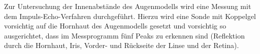 Zur Untersuchung der Innenabstände des Augenmodells wird eine Messung mit dem Impuls-Echo-Verfahren durchgeführt. Hierzu wird eine Sonde mit Koppelgel vorsichtig auf die Hornhaut des Augenmodells gesetzt und vorsichtig so ausgerichtet, dass im Messprogramm fünf Peaks zu erkennen sind (Reflektion durch die Hornhaut, Iris, Vorder- und Rückseite der Linse und der Retina).
